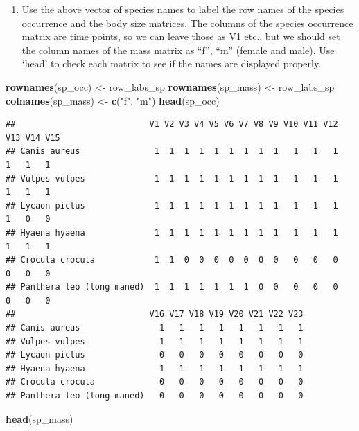 \documentclass[
]{article}
\newenvironment{Shaded}{\begin{snugshade}}{\end{snugshade}}
\newcommand{\FunctionTok}[1]{\textcolor[rgb]{0.13,0.29,0.53}{\textbf{#1}}}
\newcommand{\NormalTok}[1]{#1}
\newcommand{\OtherTok}[1]{\textcolor[rgb]{0.56,0.35,0.01}{#1}}
\newcommand{\StringTok}[1]{\textcolor[rgb]{0.31,0.60,0.02}{#1}}
\providecommand{\tightlist}{%
  \setlength{\itemsep}{0pt}\setlength{\parskip}{0pt}}
\begin{document}
\begin{enumerate}
\def\labelenumi{\alph{enumi}.}
\tightlist
\item
  Use the above vector of species names to label the row names of the
  species occurrence and the body size matrices. The columns of the
  species occurrence matrix are time points, so we can leave those as V1
  etc., but we should set the column names of the mass matrix as ``f'',
  ``m'' (female and male). Use `head' to check each matrix to see if the
  names are displayed properly.
\end{enumerate}

\begin{Shaded}
\begin{Highlighting}[]
\FunctionTok{rownames}\NormalTok{(sp\_occ) }\OtherTok{\textless{}{-}}\NormalTok{ row\_labs\_sp}
\FunctionTok{rownames}\NormalTok{(sp\_mass) }\OtherTok{\textless{}{-}}\NormalTok{ row\_labs\_sp}
\FunctionTok{colnames}\NormalTok{(sp\_mass) }\OtherTok{\textless{}{-}} \FunctionTok{c}\NormalTok{(}\StringTok{"f"}\NormalTok{, }\StringTok{"m"}\NormalTok{)}
\FunctionTok{head}\NormalTok{(sp\_occ)}
\end{Highlighting}
\end{Shaded}

\begin{verbatim}
##                           V1 V2 V3 V4 V5 V6 V7 V8 V9 V10 V11 V12 V13 V14 V15
## Canis aureus               1  1  1  1  1  1  1  1  1   1   1   1   1   1   1
## Vulpes vulpes              1  1  1  1  1  1  1  1  1   1   1   1   1   1   1
## Lycaon pictus              1  1  1  1  1  1  1  1  1   1   1   1   1   0   0
## Hyaena hyaena              1  1  1  1  1  1  1  1  1   1   1   1   1   1   1
## Crocuta crocuta            1  1  0  0  0  0  0  0  0   0   0   0   0   0   0
## Panthera leo (long maned)  1  1  1  1  1  1  1  0  0   0   0   0   0   0   0
##                           V16 V17 V18 V19 V20 V21 V22 V23
## Canis aureus                1   1   1   1   1   1   1   1
## Vulpes vulpes               1   1   1   1   1   1   1   1
## Lycaon pictus               0   0   0   0   0   0   0   0
## Hyaena hyaena               1   1   1   1   1   1   1   1
## Crocuta crocuta             0   0   0   0   0   0   0   0
## Panthera leo (long maned)   0   0   0   0   0   0   0   0
\end{verbatim}

\begin{Shaded}
\begin{Highlighting}[]
\FunctionTok{head}\NormalTok{(sp\_mass)}
\end{Highlighting}
\end{Shaded}
\end{document}
